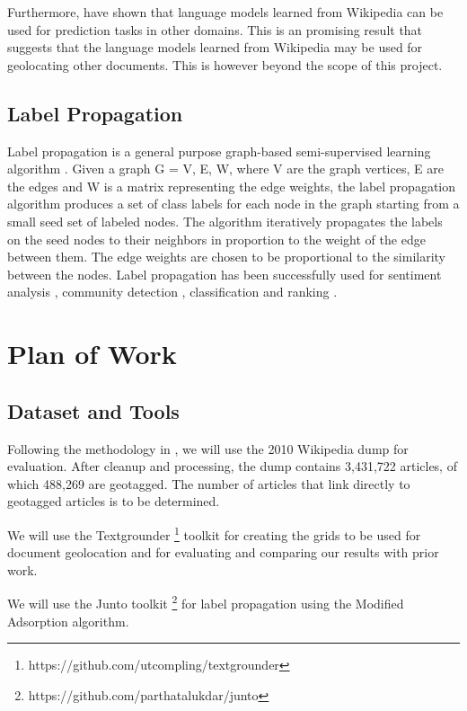 \documentclass[11pt]{article}
\newcommand{\comment}[1]{}
\begin{document}
Furthermore, \cite{kumar-et-al:11} have shown that language models learned from Wikipedia can be used for prediction tasks in other domains. This is an 
promising result that suggests that the language models learned from Wikipedia may be used for geolocating other documents. This is however beyond the scope
of this project.


\subsection{Label Propagation}
Label propagation is a general purpose graph-based semi-supervised learning algorithm \cite{talukdar:09} \cite{talukdar:10}. 
Given a graph G = {V, E, W}, where V are the graph vertices, E are the edges and W is a matrix representing the edge weights, 
the label propagation algorithm produces a set of class labels for each node in the graph starting from a small seed set of labeled nodes. 
The algorithm iteratively propagates the labels on the seed nodes to their neighbors in proportion to the weight of the edge between them. 
The edge weights are chosen to be proportional to the similarity between the nodes. 
Label propagation has been successfully used for sentiment analysis \cite{sperisou}, community detection \cite{talukdar}, 
classification and ranking \cite{something} \comment{and recommendation, youtube}. 




\section{Plan of Work}
\subsection{Dataset and Tools}
Following the methodology in \cite{wing-baldridge:11}, we will use the 2010 Wikipedia dump for evaluation. 
After cleanup and processing, the dump contains 3,431,722  articles, of which 488,269 are geotagged. 
The number of articles that link directly to geotagged articles is to be determined.

We will use the Textgrounder \footnote{https://github.com/utcompling/textgrounder} toolkit for creating the grids to be used for document geolocation and for evaluating 
and comparing our results with prior work.
 
We will use the Junto toolkit \footnote{https://github.com/parthatalukdar/junto} for label propagation using the Modified Adsorption algorithm.
\end{document}
